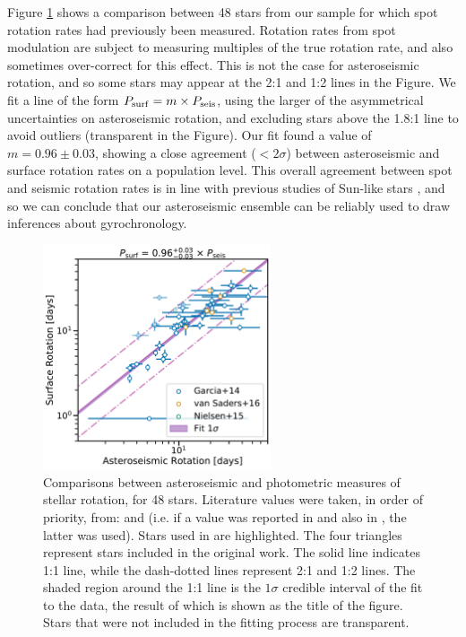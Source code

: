 \documentclass[12pt]{article}
\begin{document}
Figure \ref{fig:protlit} shows a comparison between 48 stars from our sample for which spot  rotation rates had previously been measured. Rotation rates from spot modulation are subject to measuring multiples of the true rotation rate, and also sometimes over-correct for this effect. This is not the case for asteroseismic rotation, and so some stars may appear at the 2:1 and 1:2 lines in the Figure. We fit a line of the form $P_{\rm surf} = m \times P_{\rm seis}$, using the larger of the asymmetrical uncertainties on asteroseismic rotation, and excluding stars above the 1.8:1 line to avoid outliers (transparent in the Figure). Our fit found a value of $m = 0.96 \pm 0.03$, showing a close agreement ($<2\sigma$) between asteroseismic and surface rotation rates on a population level. 
This overall agreement between spot and seismic rotation rates is in line with previous studies of Sun-like stars \cite{gizon+2013, chaplin+2013, nielsen+2015, benomar+2015}, and so we can conclude that our asteroseismic ensemble can be reliably used to draw inferences about gyrochronology.\\

\begin{figure}
	\centering
	\includegraphics[width=0.6\textwidth]{Images/surf-seis-comparison.pdf}
	\caption{Comparisons between asteroseismic and photometric measures of stellar rotation, for 48 stars. Literature values were taken, in order of priority, from: \cite{garcia+2014} and \cite{nielsen+2013} (i.e. if a value was reported in \cite{nielsen+2013} and also in \cite{garcia+2014}, the latter was used). Stars used in \cite{vansaders+2016} are highlighted. The four triangles represent stars included in the original \cite{nielsen+2015} work. The solid line indicates 1:1 line, while the dash-dotted lines represent 2:1 and 1:2 lines. The shaded region around the 1:1 line is the $1\sigma$ credible interval of the fit to the data, the result of which is shown as the title of the figure. Stars that were not included in the fitting process are transparent.}
	\label{fig:protlit}
\end{figure}
\end{document}
